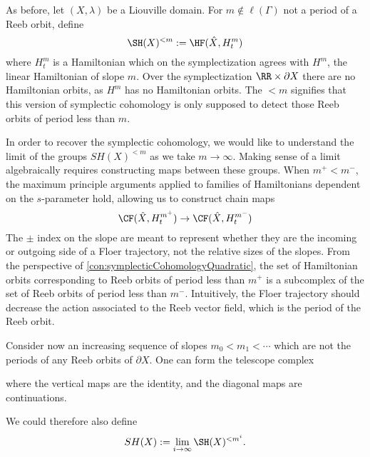 

    As before, let $(X, \lambda)$ be a Liouville domain. For $m\not\in \ell(\Gamma)$ not a period of a Reeb orbit, define 
    \[\SH(X)^{< m}:=\HF(\hat X, H^m_t)\]
    where $H^m_t$ is a Hamiltonian which on the symplectization agrees with $H^m$, the linear Hamiltonian of slope $m$. 
    Over the symplectization $\RR\times \partial X$ there are no Hamiltonian orbits, as $H^m$ has no Hamiltonian orbits. The $< m$ signifies that this version of symplectic cohomology is only supposed to detect those Reeb orbits of period less than $m$.

    In order to recover the symplectic cohomology, we would like to understand the limit of the groups $SH(X)^{< m}$ as we take $m\to\infty$. Making sense of a limit algebraically requires constructing maps between these groups. When $m^+< m^-$, the maximum principle arguments applied to families of Hamiltonians dependent on the $s$-parameter hold, allowing us to construct chain maps 
    \[\CF(\hat X, H^{m^+}_t)\to \CF(\hat X, H^{m^-}_t)\]
    The $\pm$ index on the slope are meant to represent whether they are the incoming or outgoing side of a Floer trajectory, not the relative sizes of the slopes. From the perspective of \cref{con:symplecticCohomologyQuadratic}, the set of Hamiltonian orbits corresponding to Reeb orbits of period less than $m^+$ is a subcomplex of the set of Reeb orbits of period less than $m^-$. Intuitively, the Floer trajectory should decrease the action associated to the Reeb vector field, which is the period of the Reeb orbit.
    

    Consider now an increasing sequence of slopes $m_0< m_1< \cdots $ which are not the periods of any Reeb orbits of $\partial X$. One can form the telescope complex
    
    where the vertical maps are the identity, and the diagonal maps are continuations.
    
    We could therefore also define
    \[SH(X):=\lim_{i\to\infty} \SH(X)^{< m^i}.\]
